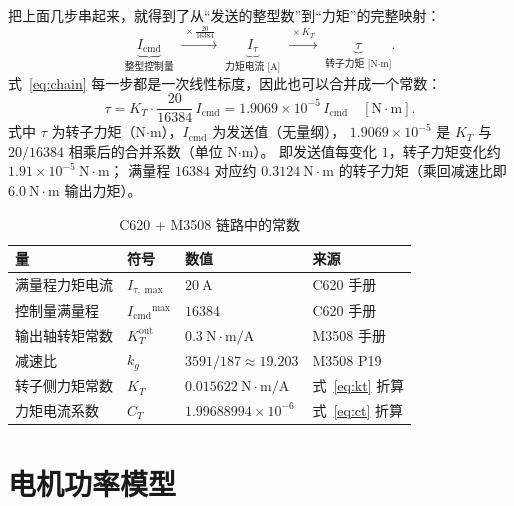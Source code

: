 \documentclass[cn,blue,11pt,device=normal]{elegantnote}
\newcommand{\Icmd}{I_{\mathrm{cmd}}{}}
\newcommand{\Itau}{I_{\tau}{}}
\newcommand{\KT}{K_{T}{}}
\newcommand{\CT}{C_{T}{}}
\newcommand{\fref}[1]{式~\eqref{#1}}
\begin{document}
把上面几步串起来，就得到了从“发送的整型数”到“力矩”的完整映射：
\begin{equation}\label{eq:chain}
  \underbrace{\Icmd}_{\text{整型控制量}}
  \;\xrightarrow{\;\times \frac{20}{16384}\;}\;
  \underbrace{\Itau}_{\text{力矩电流 [A]}}
  \;\xrightarrow{\;\times \KT\;}\;
  \underbrace{\tau}_{\text{转子力矩 [N}\cdot\text{m]}} .
\end{equation}
\fref{eq:chain} 每一步都是一次线性标度，因此也可以合并成一个常数：
\begin{equation}
  \tau = \KT \cdot \frac{20}{16384}\,\Icmd = 1.9069\times 10^{-5}\,\Icmd \quad [\mathrm{N\cdot m}].
\end{equation}
式中 $\tau$ 为转子力矩（N$\cdot$m），$\Icmd$ 为发送值（无量纲），
$1.9069\times10^{-5}$ 是 $\KT$ 与 $20/16384$ 相乘后的合并系数（单位 N$\cdot$m）。
即发送值每变化 $1$，转子力矩变化约 $1.91\times 10^{-5}\ \mathrm{N\cdot m}$；
满量程 $16384$ 对应约 $0.3124\ \mathrm{N\cdot m}$ 的转子力矩（乘回减速比即 $6.0\ \mathrm{N\cdot m}$ 输出力矩）。

\begin{table}[htbp]
  \centering
  \small
  \caption{C620 + M3508 链路中的常数}
  \label{tab:constants}
  \begin{tabular}{@{}llll@{}}
    \toprule
    量 & 符号 & 数值 & 来源 \\
    \midrule
    满量程力矩电流      & $I_{\tau,\max}$ & $20\ \mathrm{A}$           & C620 手册 \\
    控制量满量程        & $\Icmd^{\max}$  & $16384$                    & C620 手册 \\
    输出轴转矩常数      & $K_T^{\mathrm{out}}$ & $0.3\ \mathrm{N\cdot m/A}$ & M3508 手册 \\
    减速比              & $k_g$           & $3591/187 \approx 19.203$  & M3508 P19 \\
    转子侧力矩常数      & $\KT$           & $0.015622\ \mathrm{N\cdot m/A}$ & 式~\eqref{eq:kt} 折算 \\
    力矩电流系数        & $\CT$           & $1.99688994\times 10^{-6}$ & 式~\eqref{eq:ct} 折算 \\
    \bottomrule
  \end{tabular}
\end{table}

\section{电机功率模型}\label{sec:model}
\end{document}
